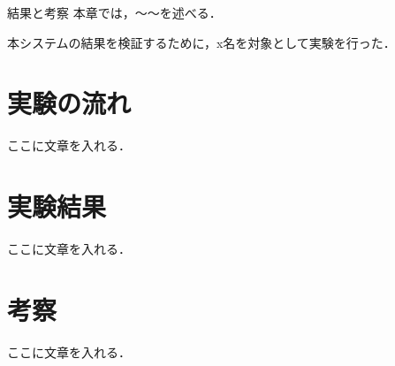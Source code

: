 \chapterhead
{結果と考察}
{本章では，〜〜を述べる．}

本システムの結果を検証するために，x名を対象として実験を行った．

\section{実験の流れ}
ここに文章を入れる．

\newpage

\section{実験結果}
ここに文章を入れる．

\newpage

\section{考察}
ここに文章を入れる．

\newpage
